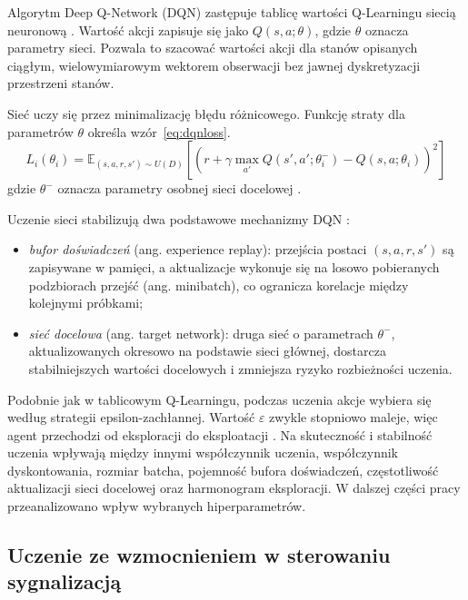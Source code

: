 Algorytm Deep Q-Network (DQN) zastępuje tablicę wartości Q-Learningu siecią neuronową \cite{mnih2013playing, sutton2018reinforcement}. Wartość akcji zapisuje się jako $Q(s, a; \theta)$, gdzie $\theta$ oznacza parametry sieci. Pozwala to szacować wartości akcji dla stanów opisanych ciągłym, wielowymiarowym wektorem obserwacji bez jawnej dyskretyzacji przestrzeni stanów.

Sieć uczy się przez minimalizację błędu różnicowego. Funkcję straty dla parametrów $\theta$ określa wzór~\ref{eq:dqnloss}.
\begin{equation}
    L_i(\theta_i) =
    \mathbb{E}_{(s,a,r,s') \sim U(D)}
    \left[
        \left(
            r + \gamma \max_{a'} Q(s',a';\theta_i^{-})
            - Q(s,a;\theta_i)
        \right)^2
    \right]
    \label{eq:dqnloss}
\end{equation}
gdzie $\theta^{-}$ oznacza parametry osobnej sieci docelowej \cite{mnih2013playing}.

Uczenie sieci stabilizują dwa podstawowe mechanizmy DQN \cite{mnih2013playing}:
\begin{itemize}
    \item \emph{bufor doświadczeń} (ang. experience replay): przejścia postaci $(s, a, r, s')$ są zapisywane w pamięci, a aktualizacje wykonuje się na losowo pobieranych podzbiorach przejść (ang. minibatch), co ogranicza korelacje między kolejnymi próbkami;
    \item \emph{sieć docelowa} (ang. target network): druga sieć o parametrach $\theta^{-}$, aktualizowanych okresowo na podstawie sieci głównej, dostarcza stabilniejszych wartości docelowych i zmniejsza ryzyko rozbieżności uczenia.
\end{itemize}

Podobnie jak w tablicowym Q-Learningu, podczas uczenia akcje wybiera się według strategii epsilon-zachłannej. Wartość $\varepsilon$ zwykle stopniowo maleje, więc agent przechodzi od eksploracji do eksploatacji \cite{sutton2018reinforcement}. Na skuteczność i stabilność uczenia wpływają między innymi współczynnik uczenia, współczynnik dyskontowania, rozmiar batcha, pojemność bufora doświadczeń, częstotliwość aktualizacji sieci docelowej oraz harmonogram eksploracji. W dalszej części pracy przeanalizowano wpływ wybranych hiperparametrów.

\subsection{Uczenie ze wzmocnieniem w sterowaniu sygnalizacją}
\label{subsec:rl-sygnalizacja}

